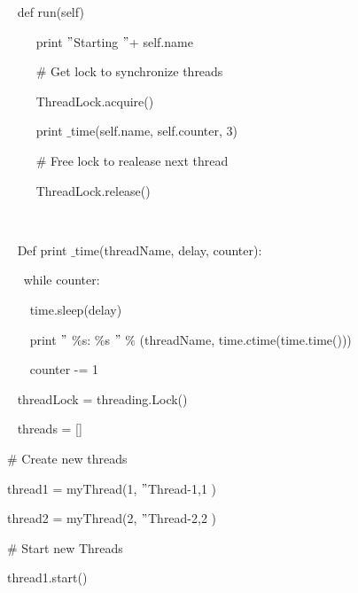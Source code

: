 \documentclass{wileySix}
\begin{document}
\begin{myEnumerate}
\noindent 
{\fontsize{10pt}{10pt}\selectfont ~ def run(self)} \par
\noindent 
{\fontsize{10pt}{10pt}\selectfont ~~~~ print  $ " $Starting  $ " $+ self.name} \par
\noindent 
{\fontsize{10pt}{10pt}\selectfont ~~~~  $  \#  $ Get lock to synchronize threads} \par
\noindent 
{\fontsize{10pt}{10pt}\selectfont ~~~~ ThreadLock.acquire()} \par
\noindent 
{\fontsize{10pt}{10pt}\selectfont ~~~~ print $  \_  $time(self.name, self.counter, 3)} \par
\noindent 
{\fontsize{10pt}{10pt}\selectfont ~~~~  $  \#  $ Free lock to realease next thread} \par
\noindent 
{\fontsize{10pt}{10pt}\selectfont ~~~~ ThreadLock.release()} \par
\noindent 
{\fontsize{10pt}{10pt}\selectfont ~ } \par
\noindent 
{\fontsize{10pt}{10pt}\selectfont ~ Def print $  \_  $time(threadName, delay, counter):} \par
\noindent 
{\fontsize{10pt}{10pt}\selectfont ~~ while counter:} \par
\noindent 
{\fontsize{10pt}{10pt}\selectfont ~~~ time.sleep(delay)} \par
\noindent 
{\fontsize{10pt}{10pt}\selectfont ~~~ print  $ " $ $  \%  $s:  $  \%  $s $ " $  $  \%  $ (threadName, time.ctime(time.time()))} \par
\noindent 
{\fontsize{10pt}{10pt}\selectfont ~~~ counter -= 1} \par
\noindent 
{\fontsize{10pt}{10pt}\selectfont ~ threadLock = threading.Lock()} \par
\noindent 
{\fontsize{10pt}{10pt}\selectfont ~ threads = []} \par
\vspace{10pt}
\noindent 
{\fontsize{10pt}{10pt}\selectfont  $  \#  $ Create new threads} \par
\noindent 
{\fontsize{10pt}{10pt}\selectfont thread1 = myThread(1,  $ " $Thread-1,1 )} \par
\noindent 
{\fontsize{10pt}{10pt}\selectfont thread2 = myThread(2,  $ " $Thread-2,2 )} \par
\vspace{10pt}
\noindent 
{\fontsize{10pt}{10pt}\selectfont  $  \#  $ Start new Threads} \par
\noindent 
{\fontsize{10pt}{10pt}\selectfont thread1.start()} \par
\noindent 

\end{myEnumerate}
\end{document}
